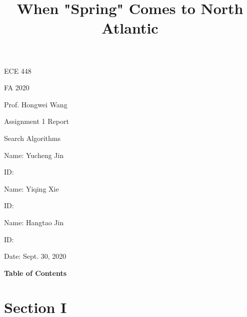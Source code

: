 \documentclass{mcmthesis}
\title{When "Spring" Comes to North Atlantic}
\begin{document}
\begin{center}


\item
\item

\huge{ECE 448} 

\huge{FA 2020}



\Large{Prof. Hongwei Wang}

\end{center}

\begin{center}

\item
\item
\item
\Huge{Assignment 1 Report}



\Huge{Search Algorithms}

\end{center}

\begin{center}

\item
\item
\item
\Large{Name: Yucheng Jin}
\item
\Large{ID: }
\item
\Large{Name: \text{ } Yiqing Xie}
\item
\Large{ID: }
\item
\Large{Name: Hangtao Jin}
\item
\Large{ID: }
\item
\Large{Date: \text{ } Sept. 30, 2020}


\end{center}

\pagebreak
\renewcommand{\contentsname}{\tiny{}}
\begin{center}
\textbf{\Large{Table of Contents}}
\end{center}
\tableofcontents
\pagebreak
\section{Section I}
\end{document}
